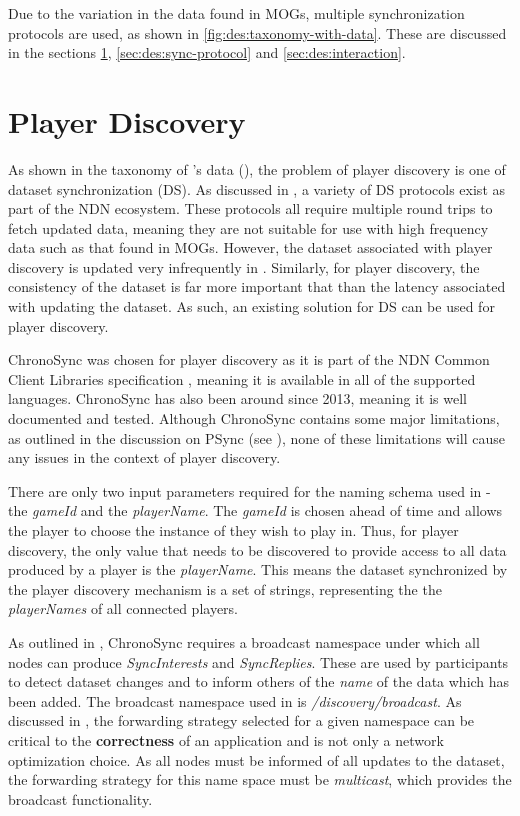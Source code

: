 Due to the variation in the data found in MOGs, multiple synchronization protocols are used, as shown in \ref{fig:des:taxonomy-with-data}. These are discussed in the sections \ref{sec:des:discovery}, \ref{sec:des:sync-protocol} and \ref{sec:des:interaction}. 

\section{Player Discovery}\label{sec:des:discovery}
As shown in the taxonomy of \game{}'s data (), the problem of player discovery is one of dataset synchronization (DS). As discussed in , a variety of DS protocols exist as part of the NDN ecosystem. These protocols all require multiple round trips to fetch updated data, meaning they are not suitable for use with high frequency data such as that found in MOGs. However, the dataset associated with player discovery is updated very infrequently in \game. Similarly, for player discovery, the consistency of the dataset is far more important that than the latency associated with updating the dataset. As such, an existing solution for DS can be used for player discovery.

ChronoSync was chosen for player discovery as it is part of the NDN Common Client Libraries specification \cite{ndn-ccl}, meaning it is available in all of the supported languages. ChronoSync has also been around since 2013, meaning it is well documented and tested. Although ChronoSync contains some major limitations, as outlined in the discussion on PSync (see ), none of these limitations will cause any issues in the context of player discovery.

There are only two input parameters required for the naming schema used in \game{} - the \textit{gameId} and the \textit{playerName}. The \textit{gameId} is chosen ahead of time and allows the player to choose the instance of \game{} they wish to play in. Thus, for player discovery, the only value that needs to be discovered to provide access to all data produced by a player is the \textit{playerName}. This means the dataset synchronized by the player discovery mechanism is a set of strings, representing the the \textit{playerNames} of all connected players.

\sloppy As outlined in , ChronoSync requires a broadcast namespace under which all nodes can produce \textit{SyncInterests} and \textit{SyncReplies}. These are used by participants to detect dataset changes and to inform others of the \textit{name} of the data which has been added. The broadcast namespace used in \game{} is \textit{\gameprefix{}/discovery/broadcast}. As discussed in , the forwarding strategy selected for a given namespace can be critical to the \textbf{correctness} of an application and is not only a network optimization choice. As all nodes must be informed of all updates to the dataset, the forwarding strategy for this name space must be \textit{multicast}, which provides the broadcast functionality.

